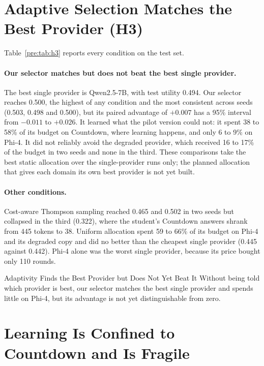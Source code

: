 \section{Adaptive Selection Matches the Best Provider (H3)}
\label{pre:sec:h3}

Table~\ref{pre:tab:h3} reports every condition on the test set.



\paragraph{Our selector matches but does not beat the best single provider.} The best
single provider is Qwen2.5-7B, with test utility 0.494. Our selector reaches 0.500, the
highest of any condition and the most consistent across seeds (0.503, 0.498 and 0.500), but
its paired advantage of $+0.007$ has a 95\% interval from $-0.011$ to $+0.026$. It learned
what the pilot version could not: it spent 38 to 58\% of its budget on Countdown, where
learning happens, and only 6 to 9\% on Phi-4. It did not reliably avoid the degraded
provider, which received 16 to 17\% of the budget in two seeds and none in the third. These
comparisons take the best static allocation over the single-provider runs only; the planned
allocation that gives each domain its own best provider is not yet built.

\paragraph{Other conditions.} Cost-aware Thompson sampling reached 0.465 and 0.502 in two
seeds but collapsed in the third (0.322), where the student's Countdown answers shrank from
445 tokens to 38. Uniform allocation spent 59 to 66\% of its budget on Phi-4 and its
degraded copy and did no better than the cheapest single provider (0.445 against 0.442).
Phi-4 alone was the worst single provider, because its price bought only 110 rounds.

\begin{takeaway}{Adaptivity Finds the Best Provider but Does Not Yet Beat It}
\label{pre:tk:h3}
Without being told which provider is best, our selector matches the best single provider
and spends little on Phi-4, but its advantage is not yet distinguishable from zero.
\end{takeaway}

\section{Learning Is Confined to Countdown and Is Fragile}
\label{pre:sec:countdown}

